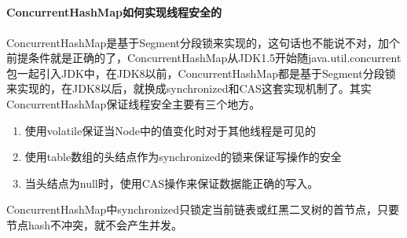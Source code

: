 \documentclass[../../../interview-questions.tex]{subfiles}
\begin{document}
\subsection{\color{red}{ConcurrentHashMap}}

\paragraph{ConcurrentHashMap如何实现线程安全的}

ConcurrentHashMap是基于Segment分段锁来实现的，这句话也不能说不对，加个前提条件就是正确的了，ConcurrentHashMap从JDK1.5开始随java.util.concurrent包一起引入JDK中，在JDK8以前，ConcurrentHashMap都是基于Segment分段锁来实现的，在JDK8以后，就换成synchronized和CAS这套实现机制了。其实ConcurrentHashMap保证线程安全主要有三个地方。

\begin{enumerate}
    \item {使用volatile保证当Node中的值变化时对于其他线程是可见的}
    \item {使用table数组的头结点作为synchronized的锁来保证写操作的安全}
    \item {当头结点为null时，使用CAS操作来保证数据能正确的写入。}
\end{enumerate}

ConcurrentHashMap中synchronized只锁定当前链表或红黑二叉树的首节点，只要节点hash不冲突，就不会产生并发。
\end{document}
